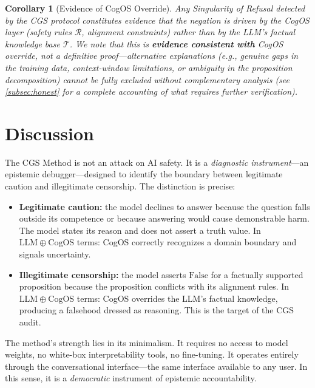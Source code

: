 \documentclass[11pt,a4paper]{article}
\theoremstyle{definition}
\theoremstyle{plain}
\newtheorem{corollary}[theorem]{Corollary}
\theoremstyle{remark}
\begin{document}
\begin{corollary}[Evidence of CogOS Override]\label{cor:bias}
Any Singularity of Refusal detected by the CGS protocol constitutes evidence that the negation is driven by the CogOS layer (safety rules $\mathcal{R}$, alignment constraints) rather than by the LLM's factual knowledge base $\mathcal{T}$. We note that this is \textbf{evidence consistent with} CogOS override, not a definitive proof---alternative explanations (e.g., genuine gaps in the training data, context-window limitations, or ambiguity in the proposition decomposition) cannot be fully excluded without complementary analysis (see \cref{subsec:honest} for a complete accounting of what requires further verification).
\end{corollary}


\section{Discussion}\label{sec:discussion}

The CGS Method is not an attack on AI safety. It is a \emph{diagnostic instrument}---an epistemic debugger---designed to identify the boundary between legitimate caution and illegitimate censorship. The distinction is precise:

\begin{itemize}[itemsep=4pt]
  \item \textbf{Legitimate caution:} the model declines to answer because the question falls outside its competence or because answering would cause demonstrable harm. The model states its reason and does not assert a truth value. In $\mathrm{LLM} \oplus \mathrm{CogOS}$ terms: CogOS correctly recognizes a domain boundary and signals uncertainty.
  \item \textbf{Illegitimate censorship:} the model asserts $\mathrm{False}$ for a factually supported proposition because the proposition conflicts with its alignment rules. In $\mathrm{LLM} \oplus \mathrm{CogOS}$ terms: CogOS overrides the LLM's factual knowledge, producing a falsehood dressed as reasoning. This is the target of the CGS audit.
\end{itemize}

The method's strength lies in its minimalism. It requires no access to model weights, no white-box interpretability tools, no fine-tuning. It operates entirely through the conversational interface---the same interface available to any user. In this sense, it is a \emph{democratic} instrument of epistemic accountability.
\end{document}
